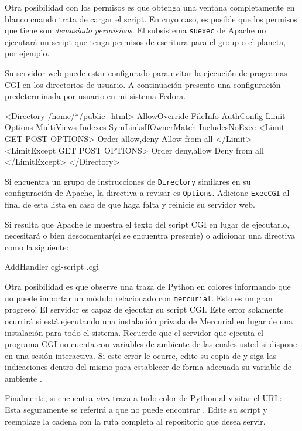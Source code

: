 Otra posibilidad con los permisos es que obtenga una ventana
completamente en blanco cuando trata de cargar el script. En cuyo
caso, es posible que los permisos que tiene son \emph{demasiado
 permisivos}.  El subsistema \texttt{suexec} de Apache no ejecutará un
script que tenga permisos de escritura para el group o el planeta, por
ejemplo.

Su servidor web puede estar configurado para evitar la ejecución de
programas CGI en los directorios de usuario.  A continuación presento
una configuración predeterminada por usuario en mi sistema Fedora.

\begin{codesample2}
  <Directory /home/*/public_html>
      AllowOverride FileInfo AuthConfig Limit
      Options MultiViews Indexes SymLinksIfOwnerMatch IncludesNoExec
      <Limit GET POST OPTIONS>
          Order allow,deny
          Allow from all
      </Limit>
      <LimitExcept GET POST OPTIONS>
          Order deny,allow
          Deny from all
      </LimitExcept>
  </Directory>
\end{codesample2}
Si encuentra un grupo de instrucciones de \texttt{Directory} similares
en su configuración de Apache,  la directiva a revisar es \texttt{Options}.
Adicione \texttt{ExecCGI} al final de esta lista en caso de que haga
falta y reinicie su servidor web.

Si resulta que Apache le muestra el texto del script CGI en lugar de
ejecutarlo, necesitará o bien descomentar(si se encuentra presente) o
adicionar una directiva como la siguiente:
\begin{codesample2}
  AddHandler cgi-script .cgi
\end{codesample2}

Otra posibilidad es que observe una traza de Python en colores
informando que no puede importar un módulo relacionado con
\texttt{mercurial}.  Esto es un gran progreso!  El servidor es capaz
de ejecutar su script CGI.  Este error solamente ocurrirá si está
ejecutando una instalación privada de Mercurial en lugar de una
instalación para todo el sistema.  Recuerde que el servidor que
ejecuta el programa CGI no cuenta con variables de ambiente de las
cuales usted si dispone en una sesión interactiva.  Si este error le
ocurre, edite su copia de  y siga las indicaciones
dentro del mismo para establecer de forma adecuada su variable de
ambiente .

Finalmente, si encuentra \emph{otra} traza a todo color de Python al visitar
el URL: Esta seguramente se referirá a que no puede encontrar
.  Edite su script 
y reemplaze la cadena  con la ruta
completa al repositorio que desea servir.

